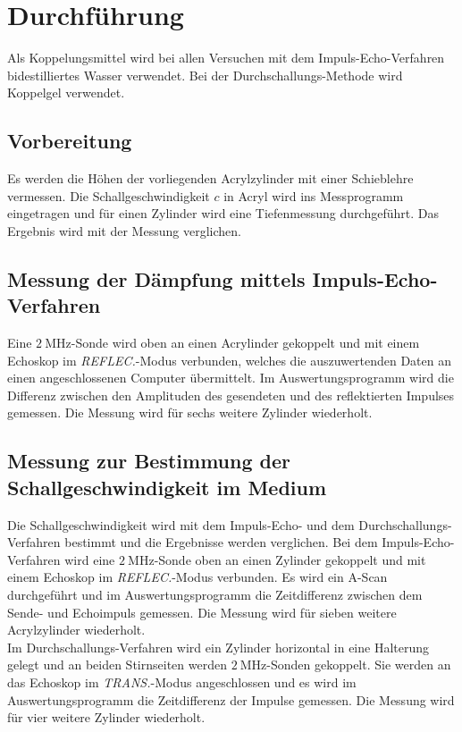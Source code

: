 \section{Durchführung}
\label{sec:Durchführung}

Als Koppelungsmittel wird bei allen Versuchen mit dem Impuls-Echo-Verfahren bidestilliertes Wasser verwendet. Bei der Durchschallungs-Methode wird Koppelgel verwendet.

\subsection{Vorbereitung}
Es werden die Höhen der vorliegenden Acrylzylinder mit einer Schieblehre vermessen. Die Schallgeschwindigkeit $c$ in Acryl wird ins Messprogramm eingetragen und für einen Zylinder wird eine Tiefenmessung durchgeführt. Das Ergebnis wird mit der Messung verglichen.

\subsection{Messung der Dämpfung mittels Impuls-Echo-Verfahren}
Eine $\SI{2}{\mega\hertz}$-Sonde wird oben an einen Acrylinder gekoppelt und mit einem Echoskop im \textit{REFLEC.}-Modus verbunden, welches die auszuwertenden Daten an einen angeschlossenen Computer übermittelt.
Im Auswertungsprogramm wird die Differenz zwischen den Amplituden des gesendeten und des reflektierten Impulses gemessen. 
Die Messung wird für sechs weitere Zylinder wiederholt.

\subsection{Messung zur Bestimmung der Schallgeschwindigkeit im Medium}
Die Schallgeschwindigkeit wird mit dem Impuls-Echo- und dem Durchschallungs-Verfahren bestimmt und die Ergebnisse werden verglichen.
Bei dem Impuls-Echo-Verfahren wird eine $\SI{2}{\mega\hertz}$-Sonde oben an einen Zylinder gekoppelt und mit einem Echoskop im \textit{REFLEC.}-Modus verbunden.
Es wird ein A-Scan durchgeführt und im Auswertungsprogramm die Zeitdifferenz zwischen dem Sende- und Echoimpuls gemessen. Die Messung wird für sieben weitere Acrylzylinder wiederholt.\\
Im Durchschallungs-Verfahren wird ein Zylinder horizontal in eine Halterung gelegt und an beiden Stirnseiten werden $\SI{2}{\mega\hertz}$-Sonden gekoppelt. Sie werden an das Echoskop im \textit{TRANS.}-Modus angeschlossen und es wird im Auswertungsprogramm die Zeitdifferenz der Impulse gemessen.
Die Messung wird für vier weitere Zylinder wiederholt.

